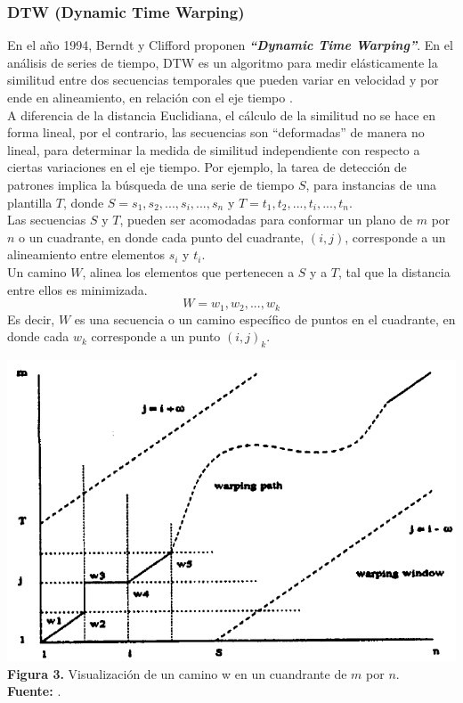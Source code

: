 \subsubsection{DTW (Dynamic Time Warping)}
En el a\~no 1994, Berndt y Clifford \cite{dtw} proponen \textit{\textbf{\enquote{Dynamic Time Warping}}}. En el an\'alisis de series de tiempo, DTW es un algoritmo para medir el\'asticamente la similitud entre dos secuencias temporales que pueden variar en velocidad y por ende en alineamiento, en relaci\'on con el eje tiempo \cite{concepts}.\\ A diferencia de la distancia Euclidiana, el c\'alculo de la similitud no se hace en forma lineal, por el contrario, las secuencias son \enquote{deformadas} de manera no lineal, para determinar la medida de similitud independiente con respecto a ciertas variaciones en el eje tiempo. Por ejemplo, la tarea de detecci\'on de patrones implica la b\'usqueda de una serie de tiempo $S$, para instancias de una plantilla $T$, donde $S = s_1, s_2, ..., s_i, ..., s_n$ y $T = t_1, t_2, ..., t_i, ..., t_n$.\\
Las secuencias $S$ y $T$, pueden ser acomodadas para conformar un plano de $m$ por $n$ o un cuadrante, en donde cada punto del cuadrante, $(i, j)$, corresponde a un alineamiento entre elementos $s_i$ y $t_i$.\\
Un camino $W$, alinea los elementos que pertenecen a $S$ y a $T$, tal que la distancia entre ellos es minimizada.\\
\begin{equation}
W = w_1, w_2, ..., w_k
\end{equation}
Es decir, $W$ es una secuencia o un camino espec\'ifico de puntos en el cuadrante, en donde cada $w_k$ corresponde a un punto $(i,j)_k$.
\begin{center}
\includegraphics[scale=0.7]{dtw.png}\\
\vspace*{10pt}
\footnotesize{\textbf{Figura 3.} Visualizaci\'on de un camino w en un cuandrante de $m$ por $n$.}\\ \textbf{Fuente:} \cite{dtw}.
\end{center}
